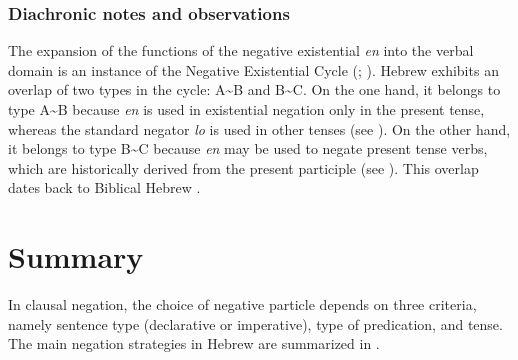 \documentclass[output=paper,colorlinks,citecolor=brown]{langscibook}
\begin{document}
\subsubsection{Diachronic notes and observations} \label{sec:heb:4.6.5}

The expansion of the functions of the negative existential \textit{en} into the verbal domain is an instance of the Negative Existential Cycle (\citealt{Croft1991}; \citealt{Veselinova2014,Veselinova2016}). Hebrew exhibits an overlap of two types in the cycle: A{\textasciitilde}B and B{\textasciitilde}C. On the one hand, it belongs to type A{\textasciitilde}B because \textit{en} is used in existential negation only in the present tense, whereas the standard negator \textit{lo} is used in other tenses (see ). On the other hand, it belongs to type B{\textasciitilde}C because \textit{en} may be used to negate present tense verbs, which are historically derived from the present participle (see ). This overlap dates back to Biblical Hebrew \citep{NaudéEtAl2019,NaudéEtAl2022}.

\section{Summary} \label{sec:heb:5}

In clausal negation, the choice of negative particle depends on three criteria, namely sentence type (declarative or imperative), type of predication, and tense. 
The main negation strategies in Hebrew are summarized in . 
\end{document}
